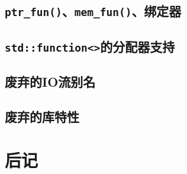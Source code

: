 \subsection{\texttt{ptr\_fun()}、\texttt{mem\_fun()}、绑定器}

\subsection{\texttt{std::function<>}的分配器支持}

\subsection{废弃的IO流别名}

\subsection{废弃的库特性}\label{ch35.2.7}

\section{后记}
